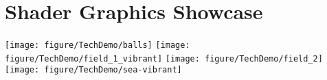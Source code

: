 \chapter{Shader Graphics Showcase}
\texttt{[image: figure/TechDemo/balls]}\label{AppendixRealLight}
\texttt{[image: figure/TechDemo/field\_1\_vibrant]}\label{AppendixCoolSurface}
\texttt{[image: figure/TechDemo/field\_2]}
\texttt{[image: figure/TechDemo/sea-vibrant]}\label{AppendixCoolWater}
